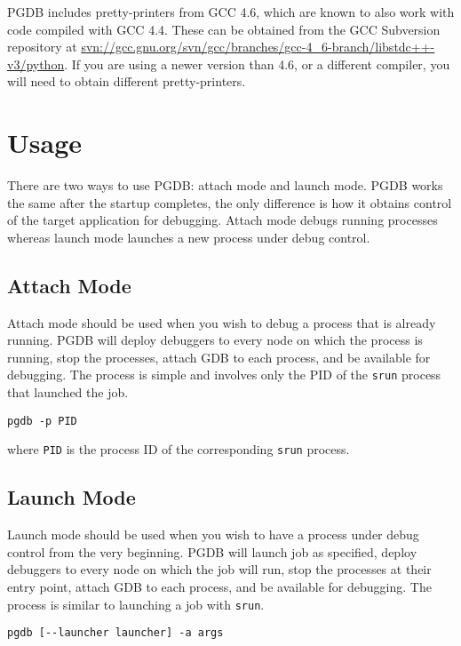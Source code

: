 \documentclass{refart}
\begin{document}
PGDB includes pretty-printers from GCC 4.6, which are known to also work with code compiled with GCC 4.4. These can be obtained from the GCC Subversion repository at \url{svn://gcc.gnu.org/svn/gcc/branches/gcc-4_6-branch/libstdc++-v3/python}. If you are using a newer version than 4.6, or a different compiler, you will need to obtain different pretty-printers.

\newpage

\section{Usage}

There are two ways to use PGDB: attach mode and launch mode. PGDB works the same after the startup completes, the only difference is how it obtains control of the target application for debugging. Attach mode debugs running processes whereas launch mode launches a new process under debug control.

\subsection{Attach Mode}

Attach mode should be used when you wish to debug a process that is already running. PGDB will deploy debuggers to every node on which the process is running, stop the processes, attach GDB to each process, and be available for debugging. The process is simple and involves only the PID of the \texttt{srun} process that launched the job.

\begin{Verbatim}
pgdb -p PID
\end{Verbatim}

where \texttt{PID} is the process ID of the corresponding \texttt{srun} process.

\subsection{Launch Mode}

Launch mode should be used when you wish to have a process under debug control from the very beginning. PGDB will launch job as specified, deploy debuggers to every node on which the job will run, stop the processes at their entry point, attach GDB to each process, and be available for debugging. The process is similar to launching a job with \texttt{srun}.

\begin{Verbatim}
pgdb [--launcher launcher] -a args
\end{Verbatim}
\end{document}
